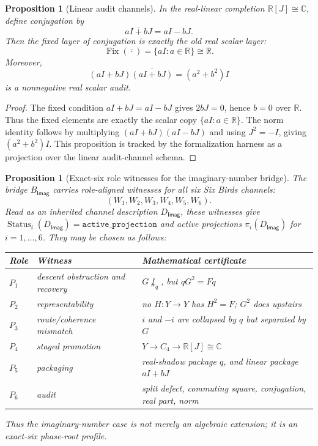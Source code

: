 \documentclass[11pt]{article}
\newcommand{\Imag}{\mathsf{Imag}}
\newcommand{\Fix}{\operatorname{Fix}}
\newtheorem{proposition}[theorem]{Proposition}
\theoremstyle{definition}
\begin{document}
\begin{proposition}[Linear audit channels]
\label{prop:imag-linear-audit-channels}
In the real-linear completion \(\mathbb R[J]\cong\mathbb C\), define conjugation by
\[
\overline{aI+bJ}=aI-bJ.
\]
Then the fixed layer of conjugation is exactly the old real scalar layer:
\[
\Fix(\overline{\cdot})=\{aI:a\in\mathbb R\}\cong\mathbb R.
\]
Moreover,
\[
(aI+bJ)\overline{(aI+bJ)}=(a^2+b^2)I
\]
is a nonnegative real scalar audit.
\end{proposition}

\begin{proof}
The fixed condition \(aI+bJ=aI-bJ\) gives \(2bJ=0\), hence \(b=0\) over
\(\mathbb R\).  Thus the fixed elements are exactly the scalar copy
\(\{aI:a\in\mathbb R\}\).  The norm identity follows by multiplying
\((aI+bJ)(aI-bJ)\) and using \(J^2=-I\), giving
\((a^2+b^2)I\).  This proposition is tracked by the formalization harness as a
projection over the linear audit-channel schema.
\end{proof}

\begin{proposition}[Exact-six role witnesses for the imaginary-number bridge]
\label{prop:imag-exact-six-witnesses}
The bridge \(B_{\Imag}\) carries role-aligned witnesses for all six Six Birds channels:
\[
(W_1,W_2,W_3,W_4,W_5,W_6).
\]
Read as an inherited channel description \(D_{\Imag}\), these witnesses give \(\operatorname{Status}_i(D_{\Imag})=\texttt{active\_projection}\) and active projections \(\pi_i(D_{\Imag})\) for \(i=1,\ldots,6\).
They may be chosen as follows:
\begin{center}
\begin{tabular}{lll}
Role & Witness & Mathematical certificate \\
\hline
\(P_1\) & descent obstruction and recovery & \(G\not\downarrow_q\), but \(qG^2=Fq\) \\
\(P_2\) & representability & no \(H:Y\to Y\) has \(H^2=F\); \(G^2\) does upstairs \\
\(P_3\) & route/coherence mismatch & \(i\) and \(-i\) are collapsed by \(q\) but separated by \(G\) \\
\(P_4\) & staged promotion & \(Y\to C_4\to \mathbb R[J]\cong\mathbb C\) \\
\(P_5\) & packaging & real-shadow package \(q\), and linear package \(aI+bJ\) \\
\(P_6\) & audit & split defect, commuting square, conjugation, real part, norm \\
\end{tabular}
\end{center}
Thus the imaginary-number case is not merely an algebraic extension; it is an exact-six phase-root profile.
\end{proposition}
\end{document}
